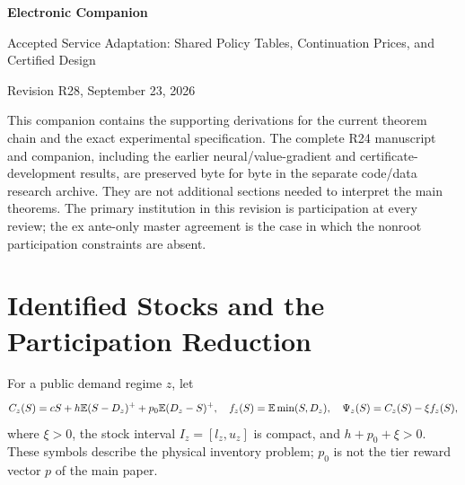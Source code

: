 \documentclass[11pt,letterpaper]{article}
\theoremstyle{definition}\newtheorem{remark}[theorem]{Remark}
\begin{document}
\begin{center}{\Large\bfseries Electronic Companion}\par\vspace{.12in}
Accepted Service Adaptation: Shared Policy Tables, Continuation Prices, and Certified Design\par
Revision R28, September 23, 2026\end{center}
This companion contains the supporting derivations for the current theorem chain and the exact experimental specification. The complete R24 manuscript and companion, including the earlier neural/value-gradient and certificate-development results, are preserved byte for byte in the separate code/data research archive. They are not additional sections needed to interpret the main theorems. The primary institution in this revision is participation at every review; the ex ante-only master agreement is the case in which the nonroot participation constraints are absent.

\section{Identified Stocks and the Participation Reduction}\label{ec:stock}
For a public demand regime $z$, let
\[
 C_z(S)=cS+h\mathbb E(S-D_z)^++p_0\mathbb E(D_z-S)^+,\quad
 f_z(S)=\mathbb E\min(S,D_z),\quad \Psi_z(S)=C_z(S)-\xi f_z(S),
\]
where $\xi>0$, the stock interval $I_z=[l_z,u_z]$ is compact, and $h+p_0+\xi>0$. These symbols describe the physical inventory problem; $p_0$ is not the tier reward vector $p$ of the main paper.
\end{document}
